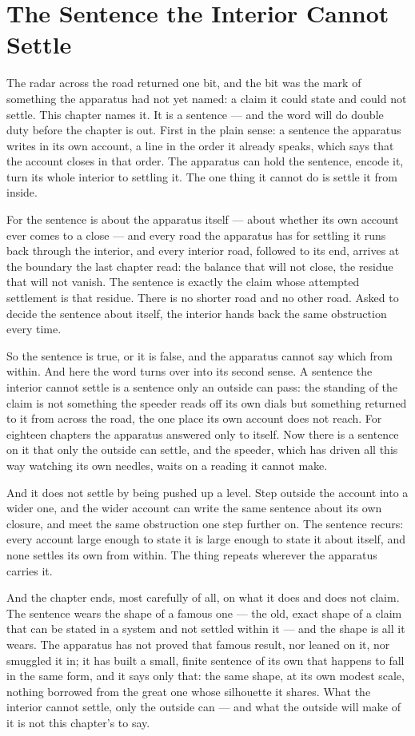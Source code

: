 \chapter{The Sentence the Interior Cannot Settle}

The radar across the road returned one bit, and the bit was the mark of something the apparatus had not yet named: a claim it could state and could not settle. This chapter names it. It is a sentence --- and the word will do double duty before the chapter is out. First in the plain sense: a sentence the apparatus writes in its own account, a line in the order it already speaks, which says that the account closes in that order. The apparatus can hold the sentence, encode it, turn its whole interior to settling it. The one thing it cannot do is settle it from inside.

For the sentence is about the apparatus itself --- about whether its own account ever comes to a close --- and every road the apparatus has for settling it runs back through the interior, and every interior road, followed to its end, arrives at the boundary the last chapter read: the balance that will not close, the residue that will not vanish. The sentence is exactly the claim whose attempted settlement is that residue. There is no shorter road and no other road. Asked to decide the sentence about itself, the interior hands back the same obstruction every time.

So the sentence is true, or it is false, and the apparatus cannot say which from within. And here the word turns over into its second sense. A sentence the interior cannot settle is a sentence only an outside can pass: the standing of the claim is not something the speeder reads off its own dials but something returned to it from across the road, the one place its own account does not reach. For eighteen chapters the apparatus answered only to itself. Now there is a sentence on it that only the outside can settle, and the speeder, which has driven all this way watching its own needles, waits on a reading it cannot make.

And it does not settle by being pushed up a level. Step outside the account into a wider one, and the wider account can write the same sentence about its own closure, and meet the same obstruction one step further on. The sentence recurs: every account large enough to state it is large enough to state it about itself, and none settles its own from within. The thing repeats wherever the apparatus carries it.

And the chapter ends, most carefully of all, on what it does and does not claim. The sentence wears the shape of a famous one --- the old, exact shape of a claim that can be stated in a system and not settled within it --- and the shape is all it wears. The apparatus has not proved that famous result, nor leaned on it, nor smuggled it in; it has built a small, finite sentence of its own that happens to fall in the same form, and it says only that: the same shape, at its own modest scale, nothing borrowed from the great one whose silhouette it shares. What the interior cannot settle, only the outside can --- and what the outside will make of it is not this chapter's to say.

